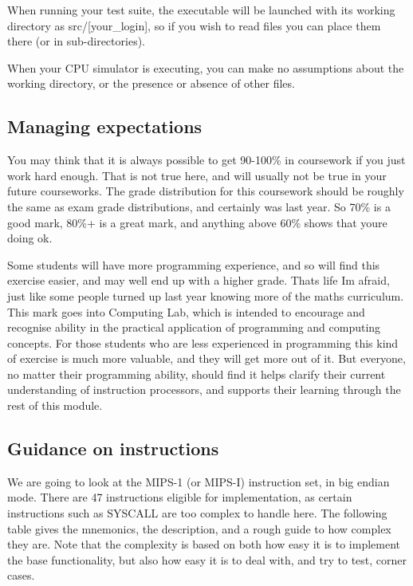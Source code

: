 When running your test suite, the executable will be launched with its working directory as {\ttfamily src/\mbox{[}your\+\_\+login\mbox{]}}, so if you wish to read files you can place them there (or in sub-\/directories).

When your C\+P\+U simulator is executing, you can make no assumptions about the working directory, or the presence or absence of other files.

\subsection*{Managing expectations }

You may think that it is always possible to get 90-\/100\% in coursework if you just work hard enough. That is not true here, and will usually not be true in your future courseworks. The grade distribution for this coursework should be roughly the same as exam grade distributions, and certainly was last year. So 70\% is a good mark, 80\%+ is a great mark, and anything above 60\% shows that you\textquotesingle{}re doing ok.

Some students will have more programming experience, and so will find this exercise easier, and may well end up with a higher grade. That\textquotesingle{}s life I\textquotesingle{}m afraid, just like some people turned up last year knowing more of the maths curriculum. This mark goes into Computing Lab, which is intended to encourage and recognise ability in the practical application of programming and computing concepts. For those students who are less experienced in programming this kind of exercise is much more valuable, and they will get more out of it. But everyone, no matter their programming ability, should find it helps clarify their current understanding of instruction processors, and supports their learning through the rest of this module.

\subsection*{Guidance on instructions }

We are going to look at the M\+I\+P\+S-\/1 (or M\+I\+P\+S-\/\+I) instruction set, in big endian mode. There are 47 instructions eligible for implementation, as certain instructions such as S\+Y\+S\+C\+A\+L\+L are too complex to handle here. The following table gives the mnemonics, the description, and a rough guide to how complex they are. Note that the complexity is based on both how easy it is to implement the base functionality, but also how easy it is to deal with, and try to test, corner cases.

